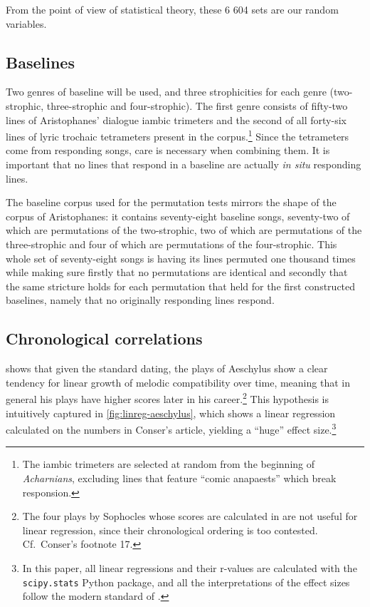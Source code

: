 \documentclass[twoside]{article}
\begin{document}
From the point of view of statistical theory, these 6 604 sets are our random variables. 

\subsection{Baselines}

Two genres of baseline will be used, and three strophicities for each genre (two-strophic, three-strophic and four-strophic). The first genre consists of fifty-two lines of Aristophanes' dialogue iambic trimeters and the second of all forty-six lines of lyric trochaic tetrameters present in the corpus.\footnote{The iambic trimeters are selected at random from the beginning of \textit{Acharnians}, excluding lines that feature ``comic anapaests'' which break responsion.} Since the tetrameters come from responding songs, care is necessary when combining them. It is important that no lines that respond in a baseline are actually \textit{in situ} responding lines.

The baseline corpus used for the permutation tests mirrors the shape of the corpus of Aristophanes: it contains seventy-eight baseline songs, seventy-two of which are permutations of the two-strophic, two of which are permutations of the three-strophic and four of which are permutations of the four-strophic. This whole set of seventy-eight songs is having its lines permuted one thousand times while making sure firstly that no permutations are identical and secondly that the same stricture holds for each permutation that held for the first constructed baselines, namely that no originally responding lines respond.

\subsection{Chronological correlations}\label{sec:chrono}

\textcite{conserPitchAccentMelody2020} shows that given the standard dating, the plays of Aeschylus show a clear tendency for linear growth of melodic compatibility over time, meaning that in general his plays have higher scores later in his career.\footnote{The four plays by Sophocles whose scores are calculated in \textcite{conserAiolaNuxMusical2024} are not useful for linear regression, since their chronological ordering is too contested. Cf.\ Conser's footnote 17.} This hypothesis is intuitively captured in \autoref{fig:linreg-aeschylus}, which shows a linear regression calculated on the numbers in Conser's article, yielding a ``huge'' effect size.\footnote{In this paper, all linear regressions and their r-values are calculated with the \texttt{scipy.stats} Python package, and all the interpretations of the effect sizes follow the modern standard of \textcite{sawilowskyNewEffectSize2009}.}
\end{document}
